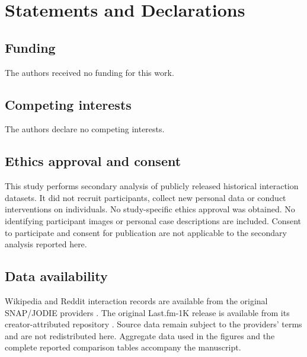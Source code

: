 \section*{Statements and Declarations}
\subsection*{Funding}
The authors received no funding for this work.
\subsection*{Competing interests}
The authors declare no competing interests.
\subsection*{Ethics approval and consent}
This study performs secondary analysis of publicly released historical interaction datasets. It did not recruit participants, collect new personal data or conduct interventions on individuals. No study-specific ethics approval was obtained. No identifying participant images or personal case descriptions are included. Consent to participate and consent for publication are not applicable to the secondary analysis reported here.
\subsection*{Data availability}
Wikipedia and Reddit interaction records are available from the original SNAP/JODIE providers \cite{jodie}. The original Last.fm-1K release is available from its creator-attributed repository \cite{lastfm}. Source data remain subject to the providers' terms and are not redistributed here. Aggregate data used in the figures and the complete reported comparison tables accompany the manuscript.
